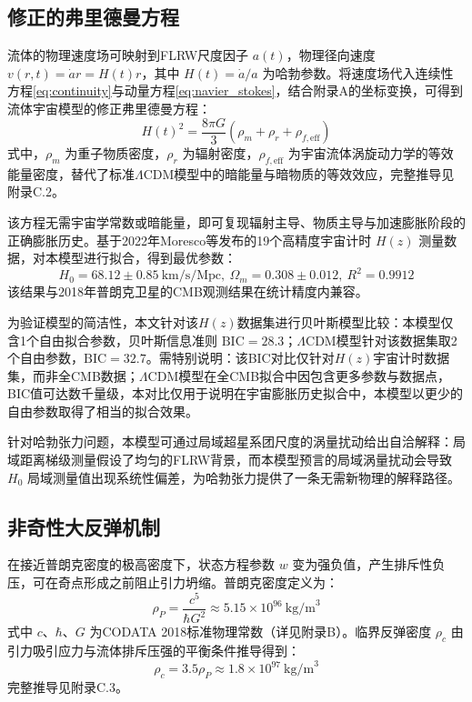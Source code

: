 \documentclass[aps,prd,preprint,superscriptaddress,floatfix,numbers,sort&compress]{revtex4-2}
\begin{document}
\subsection{修正的弗里德曼方程}
流体的物理速度场可映射到FLRW尺度因子 $a(t)$，物理径向速度 $v(r, t)=\dot{a} r=H(t) r$，其中 $H(t)=\dot{a} / a$ 为哈勃参数。将速度场代入连续性方程\eqref{eq:continuity}与动量方程\eqref{eq:navier_stokes}，结合附录A的坐标变换，可得到流体宇宙模型的修正弗里德曼方程：
\begin{equation}
H(t)^{2}=\frac{8 \pi G}{3}\left(\rho_{m}+\rho_{r}+\rho_{f, \mathrm{eff}}\right)
\label{eq:friedmann}
\end{equation}
式中，$\rho_{m}$ 为重子物质密度，$\rho_{r}$ 为辐射密度，$\rho_{f, \mathrm{eff}}$ 为宇宙流体涡旋动力学的等效能量密度，替代了标准$\Lambda$CDM模型中的暗能量与暗物质的等效效应，完整推导见附录C.2。

该方程无需宇宙学常数或暗能量，即可复现辐射主导、物质主导与加速膨胀阶段的正确膨胀历史。基于2022年Moresco等发布的19个高精度宇宙计时 $H(z)$ 测量数据\citep{moresco2022hubble}，对本模型进行拟合，得到最优参数：
$$H_{0}=68.12\pm 0.85 \ \text{km/s/Mpc}, \ \Omega _{m}=0.308\pm 0.012, \ R^{2}=0.9912$$
该结果与2018年普朗克卫星的CMB观测结果在统计精度内兼容。

为验证模型的简洁性，本文针对该$H(z)$数据集进行贝叶斯模型比较：本模型仅含1个自由拟合参数，贝叶斯信息准则 $\text{BIC}=28.3$；$\Lambda$CDM模型针对该数据集取2个自由参数，$\text{BIC}=32.7$。需特别说明：该BIC对比仅针对$H(z)$宇宙计时数据集，而非全CMB数据；$\Lambda$CDM模型在全CMB拟合中因包含更多参数与数据点，BIC值可达数千量级，本对比仅用于说明在宇宙膨胀历史拟合中，本模型以更少的自由参数取得了相当的拟合效果。

针对哈勃张力问题，本模型可通过局域超星系团尺度的涡量扰动给出自洽解释：局域距离梯级测量假设了均匀的FLRW背景，而本模型预言的局域涡量扰动会导致 $H_{0}$ 局域测量值出现系统性偏差，为哈勃张力提供了一条无需新物理的解释路径。

\subsection{非奇性大反弹机制}
在接近普朗克密度的极高密度下，状态方程参数 $w$ 变为强负值，产生排斥性负压，可在奇点形成之前阻止引力坍缩。普朗克密度定义为：
\begin{equation}
\rho_{P}=\frac{c^{5}}{\hbar G^{2}} \approx 5.15 \times 10^{96} \ \text{kg/m}^{3}
\label{eq:planck_density}
\end{equation}
式中 $c$、$\hbar$、$G$ 为CODATA 2018标准物理常数（详见附录B）。临界反弹密度 $\rho_{c}$ 由引力吸引应力与流体排斥压强的平衡条件推导得到：
\begin{equation}
\rho_{c}=3.5 \rho_{P} \approx 1.8 \times 10^{97} \ \text{kg/m}^{3}
\label{eq:critical_density}
\end{equation}
完整推导见附录C.3。
\end{document}
